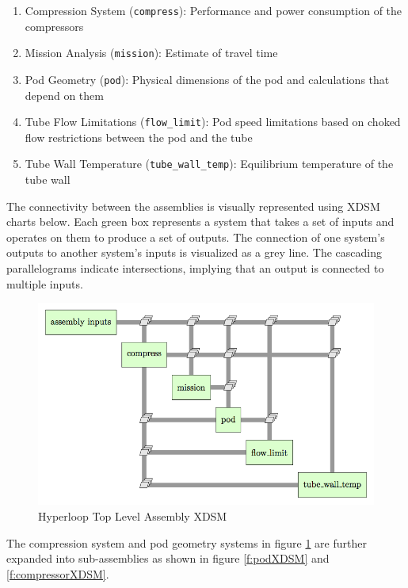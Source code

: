 \documentclass[heading.tex]{subfiles}
\begin{document}
\begin{enumerate}
  \item Compression System (\texttt{compress}): Performance and power consumption of the compressors
  \item Mission Analysis (\texttt{mission}): Estimate of travel time
  \item Pod Geometry (\texttt{pod}): Physical dimensions of the pod and calculations that depend on them
  \item Tube Flow Limitations (\texttt{flow\_limit}): Pod speed limitations based on choked flow restrictions between the pod and the tube
  \item Tube Wall Temperature (\texttt{tube\_wall\_temp}): Equilibrium temperature of the tube wall
\end{enumerate}

The connectivity between the assemblies is visually represented using XDSM charts below. Each green box represents a system that takes a
set of inputs and operates on them to produce a set of outputs. The connection of one system's outputs to another system's inputs is
visualized as a grey line. The cascading parallelograms indicate intersections, implying that an output is connected to multiple inputs. 


\begin{figure}[hbtp]
\centering
\includegraphics[width=\textwidth]{images/hyperloop_assembly_xdsm.png}
\caption{Hyperloop Top Level Assembly XDSM}
\label{f:hyperloopXDSM}
\end{figure}

The compression system and pod geometry systems in figure \ref{f:hyperloopXDSM} are further expanded into sub-assemblies as shown in figure \ref{f:podXDSM} and \ref{f:compressorXDSM}.
\end{document}
